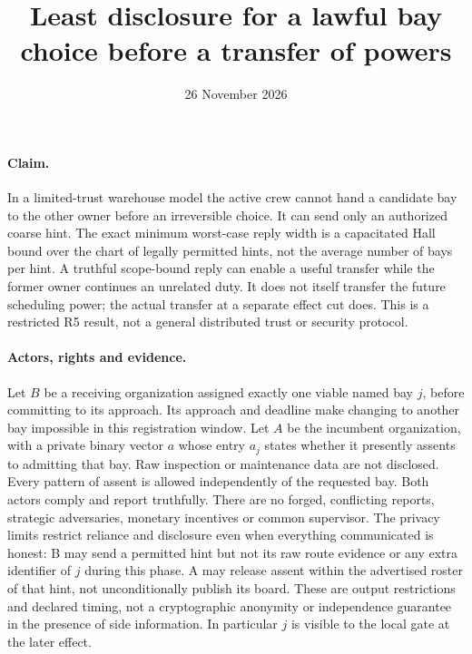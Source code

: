 \documentclass{article}
\title{Least disclosure for a lawful bay choice before a transfer of powers}
\date{26 November 2026}
\begin{document}
\maketitle
\paragraph{Claim.}
In a limited-trust warehouse model the active crew cannot hand a
candidate bay to the other owner before an irreversible choice. It can
send only an authorized coarse hint. The exact minimum worst-case
reply width is a capacitated Hall bound over the chart of legally
permitted hints, not the average number of bays per hint. A truthful
scope-bound reply can enable a useful transfer while the former owner
continues an unrelated duty. It does not itself transfer the future
scheduling power; the actual transfer at a separate effect cut does.
This is a restricted R5 result, not a general distributed trust or
security protocol.

\paragraph{Actors, rights and evidence.}
Let \(B\) be a receiving organization assigned exactly one viable named
bay \(j\), before committing to its approach. Its approach and deadline make changing
to another bay impossible in this registration window. Let \(A\) be
the incumbent organization, with a private binary vector \(a\) whose
entry \(a_j\) states whether it presently assents to admitting that bay.
Raw inspection or maintenance data are not disclosed. Every pattern
of assent is allowed independently of the requested bay.
Both actors comply and report truthfully. There are no forged,
conflicting reports, strategic adversaries, monetary incentives or
common supervisor. The privacy limits restrict reliance and disclosure
even when everything communicated is honest: B may send a permitted
hint but not its raw route evidence or any extra identifier of \(j\)
during this phase. A may release assent within the advertised roster
of that hint, not unconditionally publish its board. These are
output restrictions and declared timing, not a cryptographic anonymity
or independence guarantee in the presence of side information.
In particular \(j\) is visible to the local gate at the later effect.
\end{document}
